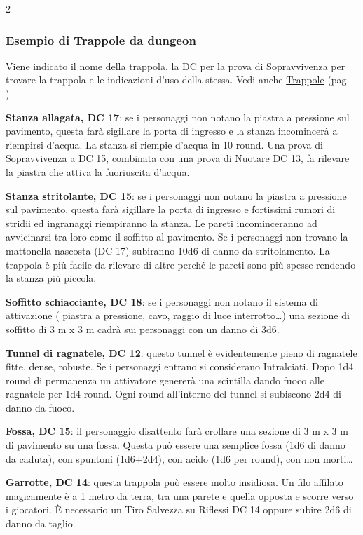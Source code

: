 \begin{multicols}{2}
\subsubsection{Esempio di Trappole da dungeon}

Viene indicato il nome della trappola, la DC per la prova di Sopravvivenza per trovare la trappola e le indicazioni d'uso della stessa. Vedi anche \hyperlink{trappoleesempio}{Trappole} (pag. \pageref{trappoleesempio}).

\medskip

\textbf{Stanza allagata, DC 17}: se i personaggi non notano la piastra a pressione sul pavimento, questa farà sigillare la porta di ingresso e la stanza incomincerà a riempirsi d'acqua.
La stanza si riempie d'acqua in 10 round. Una prova di Sopravvivenza a DC 15, combinata con una prova di Nuotare DC 13, fa rilevare la piastra che attiva la fuoriuscita d'acqua.

\textbf{Stanza stritolante, DC 15}: se i personaggi non notano la piastra a pressione sul pavimento, questa farà sigillare la porta di ingresso e fortissimi rumori di stridii ed ingranaggi riempiranno la stanza. Le pareti incominceranno ad avvicinarsi tra loro come il soffitto al pavimento. Se i personaggi non trovano la mattonella nascosta (DC 17) subiranno 10d6 di danno da stritolamento. La trappola è più facile da rilevare di altre perché le pareti sono più spesse rendendo la stanza più piccola.

\textbf{Soffitto schiacciante, DC 18}: se i personaggi non notano il sistema di attivazione ( piastra a pressione, cavo, raggio di luce interrotto…) una sezione di soffitto di 3 m x 3 m cadrà sui personaggi con un danno di 3d6.

\textbf{Tunnel di ragnatele, DC 12}: questo tunnel è evidentemente pieno di ragnatele fitte, dense, robuste. Se i personaggi entrano si considerano Intralciati. Dopo 1d4 round di permanenza un attivatore genererà una scintilla dando fuoco alle ragnatele per 1d4 round. Ogni round all'interno del tunnel si subiscono 2d4 di danno da fuoco.

\textbf{Fossa, DC 15}: il personaggio disattento farà crollare una sezione di 3 m x 3 m di pavimento su una fossa. Questa può essere una semplice fossa (1d6 di danno da caduta), con spuntoni (1d6+2d4), con acido (1d6 per round), con non morti…

\textbf{Garrotte, DC 14}: questa trappola può essere molto insidiosa. Un filo affilato magicamente è a 1 metro da terra, tra una parete e quella opposta e scorre verso i giocatori.
È necessario un Tiro Salvezza su Riflessi DC 14 oppure subire 2d6 di danno da taglio.


\end{multicols}
